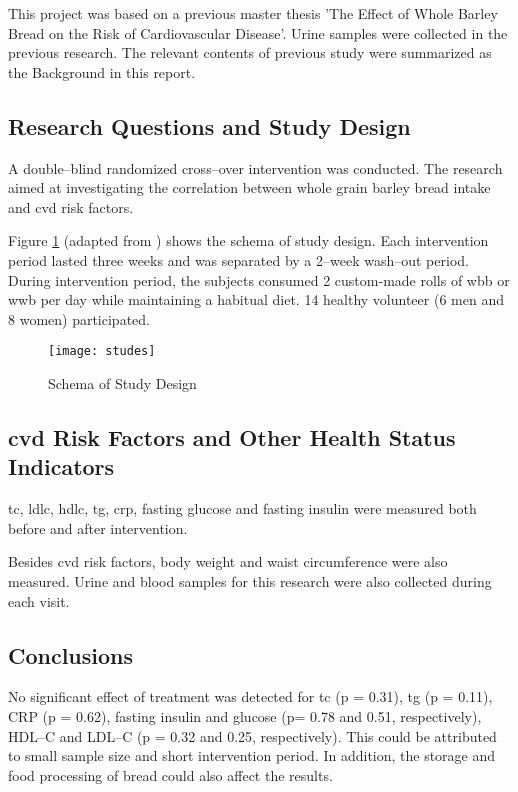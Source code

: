 This project was based on a previous master thesis 'The Effect of Whole Barley Bread on the Risk of Cardiovascular Disease'\cite{Popovici2016}. Urine samples were collected in the previous research. The relevant contents of previous study\cite{Popovici2016} were summarized as the Background in this report.

\subsection{Research Questions and Study Design}
A double–blind randomized cross–over intervention was conducted. The research aimed at investigating the correlation between whole grain barley bread intake and \acrfull{cvd} risk factors. 

Figure \ref{fig:studes} (adapted from \cite{Popovici2016}) shows the schema of study design. Each intervention period lasted three weeks and was separated by a 2–week wash–out period.
During intervention period, the subjects consumed 2 custom-made rolls of \acrfull{wbb} or \acrfull{wwb} per day while maintaining a habitual diet.
14 healthy volunteer (6 men and 8 women) participated.

\begin{figure}[h]
    \centering
    \texttt{[image: studes]}
    \caption{Schema of Study Design}
        \label{fig:studes}
\end{figure}

\subsection{\acrshort{cvd} Risk Factors and Other Health Status Indicators}
\acrfull{tc}, \acrfull{ldlc}, \acrfull{hdlc}, \acrfull{tg}, \acrfull{crp}, fasting glucose and fasting insulin were measured both before and after intervention. 

Besides \acrshort{cvd} risk factors, body weight and waist circumference were also measured. Urine and blood samples for this research were also collected during each visit. 

\subsection{Conclusions}
No significant effect of treatment was detected for \acrshort{tc} (p = 0.31), \acrlong{tg} (p = 0.11), CRP (p = 0.62), fasting insulin and glucose (p= 0.78 and 0.51, respectively), HDL–C and LDL–C (p = 0.32 and 0.25, respectively). 
This could be attributed to small sample size and short intervention period. In addition, the storage and food processing of bread could also affect the results\cite{Popovici2016}.
